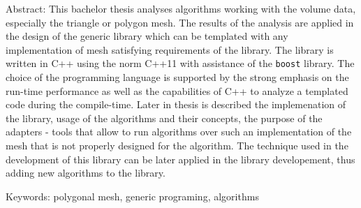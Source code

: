\documentclass[12pt,a4paper]{report}
\let\openright=\clearpage
\begin{document}
{Abstract:
This bachelor thesis analyses algorithms working with the volume data, especially
the triangle or polygon mesh. The results of the analysis are applied in the
design of the generic library which can be templated with any implementation
of mesh satisfying requirements of the library. The library is written in C++
using the norm C++11 with assistance of the \texttt{boost} library. The choice of the
programming language is supported by the strong emphasis on the run-time performance
as well as the capabilities of C++ to analyze a templated code during the compile-time.
Later in thesis is described the implemenation of the library, usage of the algorithms
and their concepts, the purpose of the adapters - tools that allow to run algorithms
over such an implementation of the mesh that is not properly designed for the algorithm.
The technique used in the development of this library can be later applied in the library
developement, thus adding new algorithms to the library.
%

Keywords:
polygonal mesh, generic programing, algorithms

\vss}

\newpage


\openright
\pagestyle{plain}
\setcounter{page}{1}
\tableofcontents
\end{document}
